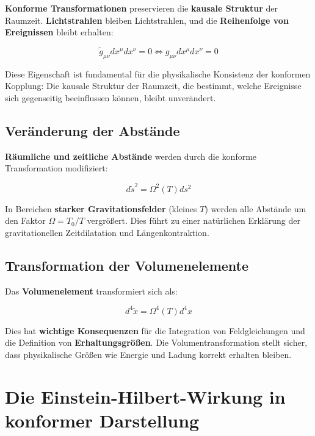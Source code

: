 \documentclass[12pt,a4paper]{report}
\begin{document}
	\textbf{Konforme Transformationen} preservieren die \textbf{kausale Struktur} der Raumzeit. \textbf{Lichtstrahlen} bleiben Lichtstrahlen, und die \textbf{Reihenfolge von Ereignissen} bleibt erhalten:
	
	\begin{equation}
		\tilde{g}_{\mu\nu} dx^\mu dx^\nu = 0 \Leftrightarrow g_{\mu\nu} dx^\mu dx^\nu = 0
	\end{equation}
	
	Diese Eigenschaft ist fundamental für die physikalische Konsistenz der konformen Kopplung: Die kausale Struktur der Raumzeit, die bestimmt, welche Ereignisse sich gegenseitig beeinflussen können, bleibt unverändert.
	
	\subsection{Veränderung der Abstände}
	
	\textbf{Räumliche und zeitliche Abstände} werden durch die konforme Transformation modifiziert:
	
	\begin{equation}
		d\tilde{s}^2 = \Omega^2(T) ds^2
	\end{equation}
	
	In Bereichen \textbf{starker Gravitationsfelder} (kleines $T$) werden alle Abstände um den Faktor $\Omega = T_0/T$ vergrößert. Dies führt zu einer natürlichen Erklärung der gravitationellen Zeitdilatation und Längenkontraktion.
	
	\subsection{Transformation der Volumenelemente}
	
	Das \textbf{Volumenelement} transformiert sich als:
	
	\begin{equation}
		d^4\tilde{x} = \Omega^4(T) d^4x
	\end{equation}
	
	Dies hat \textbf{wichtige Konsequenzen} für die Integration von Feldgleichungen und die Definition von \textbf{Erhaltungsgrößen}. Die Volumentransformation stellt sicher, dass physikalische Größen wie Energie und Ladung korrekt erhalten bleiben.
	
	\section{Die Einstein-Hilbert-Wirkung in konformer Darstellung}
	
\end{document}
